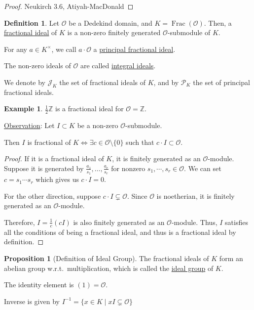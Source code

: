 \documentclass[openany]{amsbook}
\numberwithin{section}{chapter}
\theoremstyle{definition}
\newtheorem*{example}{Example}
\newtheorem*{definition}{Definition}
\newtheorem{proposition}[theorem]{Proposition}
\newcommand{\Frac}{\operatorname{Frac}}
\begin{document}
\begin{proof}
    Neukirch 3.6, Atiyah-MacDonald
\end{proof}

\begin{definition}
    Let \(\mathcal{O}\) be a Dedekind domain, and \(K = \Frac(\mathcal{O})\). Then, a \underline{fractional ideal} of \(K\) is a non-zero finitely generated \(\mathcal{O}\)-submodule of \(K\).
    
    For any \(a \in K^\times\), we call \(a \cdot \mathcal{O}\) a \underline{principal fractional ideal}.
    
    The non-zero ideals of \(\mathcal{O}\) are called \underline{integral ideals}.

    We denote by \(\mathcal{J}_K\) the set of fractional ideals of \(K\), and by \(\mathcal{P}_K\) the set of principal fractional ideals.

\end{definition}

\begin{example}
    \(\frac{1}{2}\mathbb{Z}\) is a fractional ideal for \(\mathcal{O} = \mathbb{Z}\). 
\end{example}

\underline{Observation}: Let \(I \subset K\) be a non-zero \(\mathcal{O}\)-submodule.

Then \(I\) is fractional of \(K \iff \exists c\in \mathcal{O} \setminus \{ 0 \}\) such that \(c \cdot I \subset \mathcal{O}\).

\begin{proof}
    If it is a fractional ideal of \(K\), it is finitely generated as an \(\mathcal{O} \)-module. Suppose it is generated by \( \frac{a_1}{s_1}, \dots, \frac{a_r}{s_r}   \) for nonzero \(s_1, \cdots , s_r \in \mathcal{O}\). We can set \(c = s_1 \cdots s_r\) which gives us \(c \cdot I = 0\).

    For the other direction, suppose \(c \cdot I \subsetneq \mathcal{O}\). Since \(\mathcal{O}\) is noetherian, it is finitely generated as an \(\mathcal{O}\)-module.

    Therefore, \(I = \frac{1}{c}(cI)\) is also finitely generated as an \(\mathcal{O}\)-module. Thus, \(I\) satisfies all the conditions of being a fractional ideal, and thus is a fractional ideal by definition. 

\end{proof}

\begin{proposition}
    [Definition of Ideal Group] The fractional ideals of \(K\) form an abelian group w.r.t.\ multiplication, which is called the \underline{ideal group} of \(K\).
    
    The identity element is \((1) = \mathcal{O}\).

    Inverse is given by \(I ^{-1} = \{ x \in K \mid xI \subsetneq \mathcal{O} \} \) 
\end{proposition}
\end{document}
